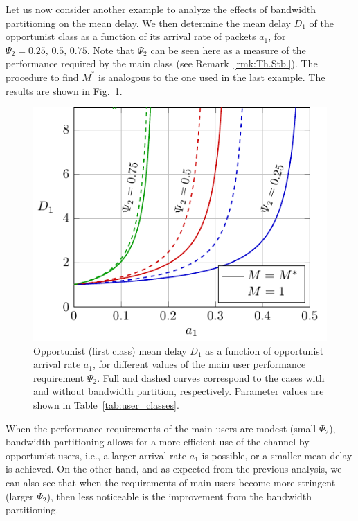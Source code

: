 Let us now consider another example to analyze the effects of bandwidth partitioning on the mean delay.
%
We then determine the mean delay $D_1$ of the opportunist class as a function of its arrival rate of packets $a_1$, for $\Psi_2 = 0.25, \, 0.5, \, 0.75$. Note that $\Psi_2$ can be seen here as a measure of the performance required by the main class (see Remark~\ref{rmk:Th.Stb.}). The procedure to find $M^*$ is analogous to the one used in the last example. The results are shown in Fig.~\ref{fig:optimum_delay}.
%
\begin{figure}[!t]
	\centering
	\includegraphics[]{./Figures/Ch7_optimum_delay.pdf}%
	\caption{Opportunist (first class) mean delay $D_1$ as a function of opportunist arrival rate $a_1$, for different values of the main user performance requirement $\Psi_2$. Full and dashed curves correspond to the cases with and without bandwidth partition, respectively. Parameter values are shown in Table~\ref{tab:user_classes}.}
	\label{fig:optimum_delay}
\end{figure}
%
When the performance requirements of the main users are modest (small $\Psi_2$), bandwidth partitioning allows for a more efficient use of the channel by opportunist users, i.e., a larger arrival rate $a_1$ is possible, or a smaller mean delay is achieved. On the other hand, and as expected from the previous analysis, we can also see that when the requirements of main users become more stringent (larger $\Psi_2$), then less noticeable is the improvement from the bandwidth partitioning.
